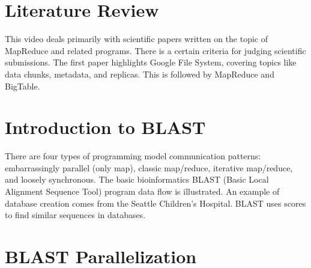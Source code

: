 

\section{Literature Review}

This video deals primarily with scientific papers written on the topic
of MapReduce and related programs. There is a certain criteria for
judging scientific submissions. The first paper highlights Google File
System, covering topics like data chunks, metadata, and replicas. This
is followed by MapReduce and BigTable.




\section{Introduction to BLAST}

There are four types of programming model communication patterns:
embarrassingly parallel (only map), classic map/reduce, iterative
map/reduce, and loosely synchronous. The basic bioinformatics BLAST
(Basic Local Alignment Sequence Tool) program data flow is illustrated.
An example of database creation comes from the Seattle Children's
Hospital. BLAST uses scores to find similar sequences in databases.




\section{BLAST Parallelization}

